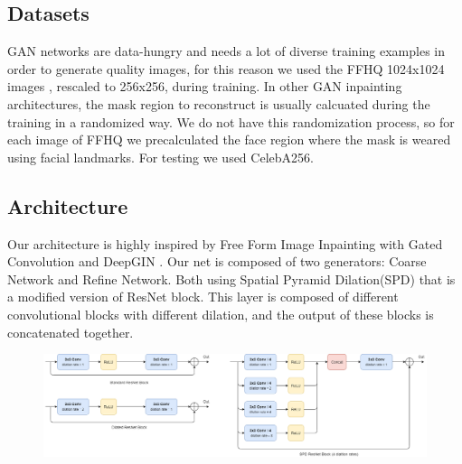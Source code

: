 \documentclass[10pt,twocolumn,letterpaper]{article}
\begin{document}
	\subsection{Datasets}
	GAN networks are data-hungry and needs a lot of diverse training examples in
	order to generate quality images, for this reason we used the FFHQ 1024x1024
	images \cite{karras2019style}, rescaled to 256x256, during training.  In other GAN inpainting
	architectures, the mask region to reconstruct is usually calcuated during the
	training in a randomized way.  We do not have this randomization process, so for
	each image of FFHQ we precalculated the face region where the mask is weared
	using facial landmarks.  For testing we used CelebA256.

	\subsection{Architecture}
	Our architecture is highly inspired by Free Form Image Inpainting with Gated Convolution \cite{yu2019free} and DeepGIN \cite{li2020deepgin}.
	Our net is composed of two generators: Coarse Network and Refine Network.
	Both using Spatial Pyramid Dilation(SPD) that is a modified version of ResNet block. This layer is composed of different convolutional blocks with different dilation, and the output of these blocks is concatenated together.
	\begin{figure}[t]
		\includegraphics[width=1\linewidth]{img/ResNetSPD.png}
		\label{fig:long}
		\label{fig:onecol}
	\end{figure}
\end{document}
